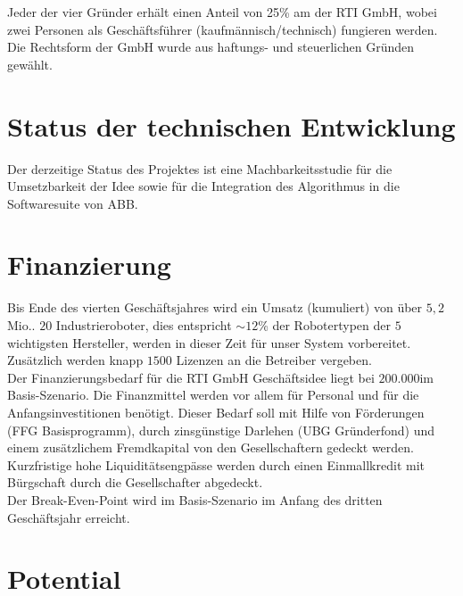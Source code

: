 Jeder der vier Gründer erhält einen Anteil von 25\% am der \textsf{RTI GmbH}, wobei zwei Personen als Geschäftsführer (kaufmännisch/technisch) fungieren werden. Die Rechtsform der GmbH wurde aus haftungs- und steuerlichen Gründen gewählt.


\section{Status der technischen Entwicklung}

Der derzeitige Status des Projektes ist eine Machbarkeitsstudie für die Umsetzbarkeit der Idee sowie für die Integration des Algorithmus in die Softwaresuite von ABB.

\section{Finanzierung}
Bis Ende des vierten Geschäftsjahres wird ein Umsatz (kumuliert) von über $5,2$Mio.\thinspace\officialeuro. $20$ Industrieroboter, dies entspricht $\sim12$\% der Robotertypen der $5$ wichtigsten Hersteller, werden in dieser Zeit für unser System vorbereitet. Zusätzlich werden knapp $1500$ Lizenzen an die Betreiber vergeben.\\
Der Finanzierungsbedarf für die \textsf{RTI GmbH} Geschäftsidee liegt bei $200.000$\officialeuro im Basis-Szenario. Die Finanzmittel werden vor allem für Personal und für die Anfangsinvestitionen benötigt. Dieser Bedarf soll mit Hilfe von Förderungen (FFG Basisprogramm), durch zinsgünstige Darlehen (UBG Gründerfond) und einem zusätzlichem Fremdkapital von den Gesellschaftern gedeckt werden. Kurzfristige hohe Liquiditätsengpässe werden durch einen Einmallkredit mit Bürgschaft durch die Gesellschafter abgedeckt.\\
Der Break-Even-Point wird im Basis-Szenario im Anfang des dritten Geschäftsjahr erreicht.


\section{Potential}
